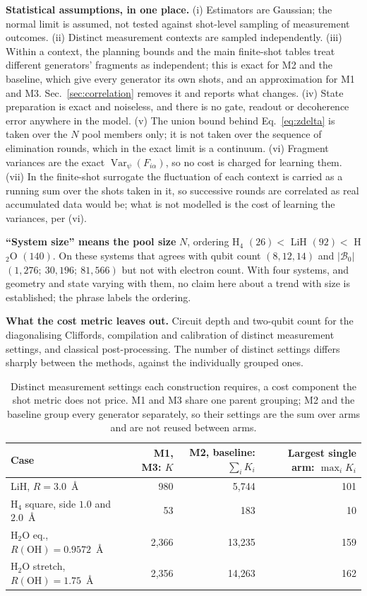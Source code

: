 \documentclass[10pt]{article}
\newcommand{\Var}{\operatorname{Var}}
\begin{document}
\textbf{Statistical assumptions, in one place.} (i) Estimators are Gaussian; the normal limit is assumed, not tested against shot-level sampling of measurement outcomes. (ii) Distinct measurement contexts are sampled independently. (iii) Within a context, the planning bounds and the main finite-shot tables treat different generators' fragments as independent; this is exact for M2 and the baseline, which give every generator its own shots, and an approximation for M1 and M3. Sec.~\ref{sec:correlation} removes it and reports what changes. (iv) State preparation is exact and noiseless, and there is no gate, readout or decoherence error anywhere in the model. (v) The union bound behind Eq.~\eqref{eq:zdelta} is taken over the $N$ pool members only; it is not taken over the sequence of elimination rounds, which in the exact limit is a continuum. (vi) Fragment variances are the exact $\Var_\psi(F_{i\alpha})$, so no cost is charged for learning them. (vii) In the finite-shot surrogate the fluctuation of each context is carried as a running sum over the shots taken in it, so successive rounds are correlated as real accumulated data would be; what is not modelled is the cost of learning the variances, per (vi).

\textbf{``System size'' means the pool size} $N$, ordering H$_4$ $(26)<$ LiH
$(92)<$ H$_2$O $(140)$. On these systems that agrees with qubit count
$(8,12,14)$ and $|\mathcal B_0|$ $(1{,}276;\ 30{,}196;\ 81{,}566)$ but not with
electron count. With four systems, and geometry and state varying with them, no
claim here about a trend with size is established; the phrase labels the
ordering.

\textbf{What the cost metric leaves out.} Circuit depth and two-qubit count for
the diagonalising Cliffords, compilation and calibration of distinct measurement
settings, and classical post-processing. The number of distinct settings differs
sharply between the methods, against the individually grouped ones.

\begin{table}[!htbp]
\centering
\scriptsize
\caption{Distinct measurement settings each construction requires, a cost component the shot metric does not price. M1 and M3 share one parent grouping; M2 and the baseline group every generator separately, so their settings are the sum over arms and are not reused between arms.}
\label{tab:settings}
\begin{tabular}{lrrr}
\toprule
Case & M1, M3: $K$ & M2, baseline: $\sum_i K_i$ & Largest single arm: $\max_i K_i$ \\
\midrule
LiH, $R=3.0$~\si{\angstrom} & 980 & 5,744 & 101 \\
H$_4$ square, side $1.0$ and $2.0$~\si{\angstrom} & 53 & 183 & 10 \\
H$_2$O eq., $R(\mathrm{OH})=0.9572$~\si{\angstrom} & 2,366 & 13,235 & 159 \\
H$_2$O stretch, $R(\mathrm{OH})=1.75$~\si{\angstrom} & 2,356 & 14,263 & 162 \\
\bottomrule
\end{tabular}
\end{table}
\end{document}
